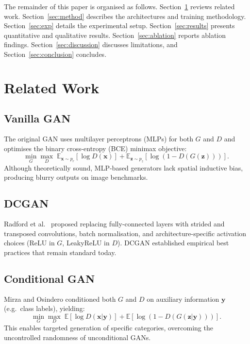 \documentclass[conference]{IEEEtran}
\begin{document}
The remainder of this paper is organised as follows. Section~\ref{sec:related} reviews related work. Section~\ref{sec:method} describes the architectures and training methodology. Section~\ref{sec:exp} details the experimental setup. Section~\ref{sec:results} presents quantitative and qualitative results. Section~\ref{sec:ablation} reports ablation findings. Section~\ref{sec:discussion} discusses limitations, and Section~\ref{sec:conclusion} concludes.

\section{Related Work}
\label{sec:related}

\subsection{Vanilla GAN}
The original GAN \cite{goodfellow2014generative} uses multilayer perceptrons (MLPs) for both $G$ and $D$ and optimises the binary cross-entropy (BCE) minimax objective:
\begin{equation}
\min_G \max_D \; \mathbb{E}_{\mathbf{x}\sim p_r}[\log D(\mathbf{x})] + \mathbb{E}_{\mathbf{z}\sim p_z}[\log(1 - D(G(\mathbf{z})))].
\label{eq:gan}
\end{equation}
Although theoretically sound, MLP-based generators lack spatial inductive bias, producing blurry outputs on image benchmarks.

\subsection{DCGAN}
Radford et al.\ \cite{radford2015dcgan} proposed replacing fully-connected layers with strided and transposed convolutions, batch normalisation, and architecture-specific activation choices (ReLU in $G$, LeakyReLU in $D$). DCGAN established empirical best practices that remain standard today.

\subsection{Conditional GAN}
Mirza and Osindero \cite{mirza2014cgan} conditioned both $G$ and $D$ on auxiliary information $\mathbf{y}$ (e.g.\ class labels), yielding:
\begin{equation}
\min_G \max_D \; \mathbb{E}[\log D(\mathbf{x}|\mathbf{y})] + \mathbb{E}[\log(1 - D(G(\mathbf{z}|\mathbf{y})))].
\end{equation}
This enables targeted generation of specific categories, overcoming the uncontrolled randomness of unconditional GANs.
\end{document}
